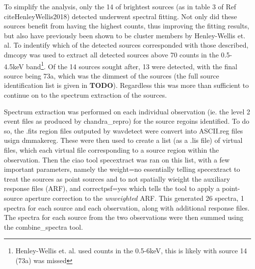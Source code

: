 \documentclass[aps,
                pra,  
                a4paper, 
                amsmath, 
                amssymb, 
                preprint,
                tightenlines,  
                amsfonts,
                nofootinbib,
                notitlepage
            ]{revtex4-2}
\begin{document}
To simplify the analysis, only the 14 of brightest sources (as in table 3 of Ref cite{HenleyWellis2018}) detected underwent spectral fitting. Not only did these sources benefit from having the highest counts, thus improving the fitting results, but also have previously been shown to be cluster members by Henley-Wellis et. al. To indentify which of the detected sources corresponded with those described, {\sc dmcopy} was used to extract all detected sources above 70 counts in the 0.5-4.5keV band\footnote{Henley-Wellis et. al. used counts in the 0.5-6keV, this is likely with source 14 (73a) was missed}. Of the 14 sources sought after, 13 were detected, with the final source being 73a, which was the dimmest of the sources (the full source identification list is given in {\bf TODO}). Regardless this was more than sufficient to continue on to the spectrum extraction of the sources. 
\par
Spectrum extraction was performed on each individual observation (ie. the level 2 event files as produced by {\sc chandra\_repro}) for the source regoins identified. To do so, the {\sc .fits} region files outputed by {\sc wavdetect} were convert into ASCII{\sc .reg} files usign {\sc dmmakereg}. These were then used to create a list (as a {\sc .lis} file) of virtual files, which each virtual file corresponding to a source region within the observation. Then the {\sc ciao} tool {\sc specextract} was ran on this list, with a few important parameters, namely the {\sc weight=no} essentially telling {\sc specextract} to treat the sources as point sources and to not spatially wieight the auxiliary response files (ARF), and {\sc correctpsf=yes} which tells the tool to apply a point-source aperture correction to the {\it unweighted} ARF. This generated 26 spectra, 1 spectra for each source and each observation, along with additional response files. The spectra for each source from the two observations were then summed using the {\sc combine\_spectra} tool. 
\par
\end{document}
